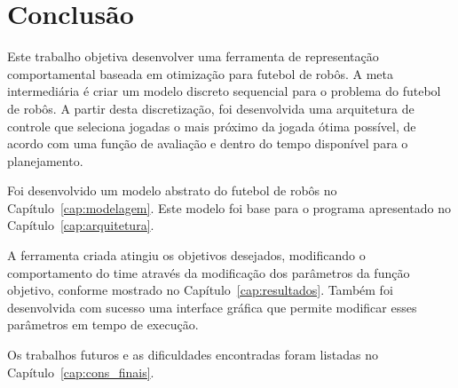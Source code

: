 \chapter{Conclusão}\label{cap:conclusao}

Este trabalho objetiva desenvolver uma ferramenta de representação
comportamental baseada em otimização para futebol de robôs.
A meta intermediária é criar um modelo discreto sequencial
para o problema do futebol de robôs. A partir desta
discretização, foi desenvolvida uma arquitetura de controle
que seleciona jogadas o mais próximo da jogada ótima possível,
de acordo com uma função de avaliação e dentro do tempo disponível
para o planejamento.

Foi desenvolvido um modelo abstrato do futebol de robôs no
Capítulo~\ref{cap:modelagem}. Este modelo foi base para o
programa apresentado no Capítulo~\ref{cap:arquitetura}.

A ferramenta criada atingiu os objetivos desejados, modificando o
comportamento do time através da modificação dos parâmetros da função
objetivo, conforme mostrado no Capítulo~\ref{cap:resultados}. Também foi
desenvolvida com sucesso uma interface gráfica que permite modificar
esses parâmetros em tempo de execução.

Os trabalhos futuros e as dificuldades encontradas foram listadas no
Capítulo~\ref{cap:cons_finais}.

